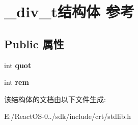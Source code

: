 \hypertarget{struct__div__t}{}\section{\+\_\+div\+\_\+t结构体 参考}
\label{struct__div__t}
\subsection*{Public 属性}
\begin{DoxyCompactItemize}
\item 
\mbox{\label{struct__div__t_a0357f43353b3e60c428b265b60e6018e}} 
int {\bfseries quot}
\item 
\mbox{\label{struct__div__t_abd7bd525ed75839ef6941d9d3105b073}} 
int {\bfseries rem}
\end{DoxyCompactItemize}


该结构体的文档由以下文件生成\+:\begin{DoxyCompactItemize}
\item 
E\+:/\+React\+O\+S-\/0../sdk/include/crt/stdlib.\+h\end{DoxyCompactItemize}
